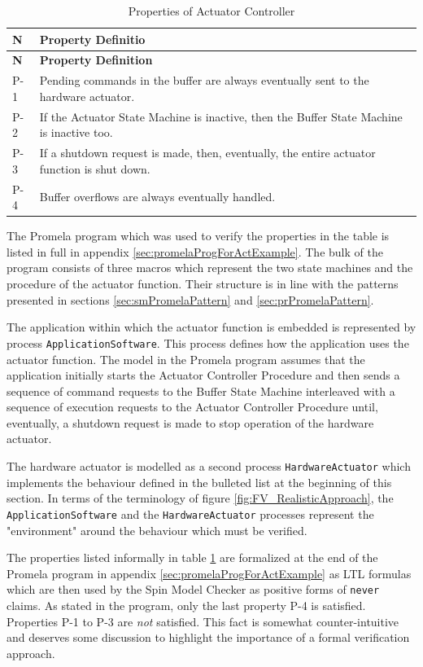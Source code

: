 \documentclass[definition]{../fwprofile}
\begin{document}
\newpage
\begin{longtable}{|p{0.9cm}|p{10.3cm}|}
\caption{Properties of Actuator Controller} \label{tab:actContProp}\\
\hline
\rowcolor{lightblue}
\textbf{N} & \textbf{Property Definitio} \\
\hline\hline
\endfirsthead
\rowcolor{lightblue}
\textbf{N} & \textbf{Property Definition} \\
\hline\hline
\endhead
P-1 & Pending commands in the buffer are always eventually sent to the hardware actuator. \\
\hline
P-2 & If the Actuator State Machine is inactive, then the Buffer State Machine is inactive too. \\
\hline
P-3 & If a shutdown request is made, then, eventually, the entire actuator function is shut down. \\
\hline
P-4 & Buffer overflows are always eventually handled. \\
\hline
\end{longtable}

The Promela program which was used to verify the properties in the table is listed in full in appendix \ref{sec:promelaProgForActExample}. The bulk of the program consists of three macros which represent the two state machines and the procedure of the actuator function. Their structure is in line with the patterns presented in sections \ref{sec:smPromelaPattern} and \ref{sec:prPromelaPattern}. 

The application within which the actuator function is embedded is represented by process \texttt{ApplicationSoftware}. This process defines how the application uses the actuator function. The model in the Promela program assumes that the application initially starts the Actuator Controller Procedure and then sends a sequence of command requests to the Buffer State Machine interleaved with a sequence of execution requests to the Actuator Controller Procedure until, eventually, a shutdown request is made to stop operation of the hardware actuator.

The hardware actuator is modelled as a second process \texttt{HardwareActuator} which implements the behaviour defined in the bulleted list at the beginning of this section. In terms of the terminology of figure \ref{fig:FV_RealisticApproach}, the \texttt{ApplicationSoftware} and the \texttt{HardwareActuator} processes represent the "environment" around the behaviour which must be verified.

The properties listed informally in table \ref{tab:actContProp} are formalized at the end of the Promela program in appendix \ref{sec:promelaProgForActExample} as LTL formulas which are then used by the Spin Model Checker as positive forms of \texttt{never} claims. As stated in the program, only the last property P-4 is satisfied. Properties P-1 to P-3 are \textit{not} satisfied. This fact is somewhat counter-intuitive and deserves some discussion to highlight the importance of a formal verification approach.
\end{document}
